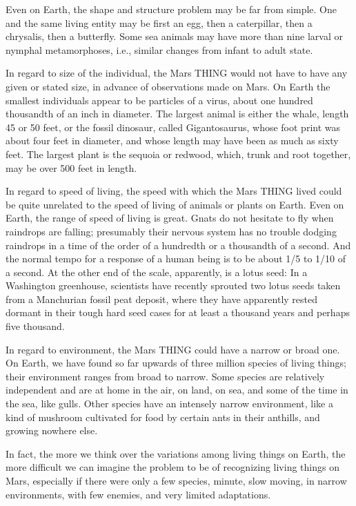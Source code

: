 \documentclass[11pt]{article}
\begin{document}
Even on Earth, the shape and structure problem may be far from simple. One and
the same living entity may be first an egg, then a caterpillar, then a
chrysalis, then a butterfly. Some sea animals may have more than nine larval or
nymphal metamorphoses, i.e., similar changes from infant to adult state.

In regard to size of the individual, the Mars THING would not have to have any
given or stated size, in advance of observations made on Mars. On Earth the
smallest individuals appear to be particles of a virus, about one hundred
thousandth of an inch in diameter. The largest animal is either the whale,
length 45 or 50 feet, or the fossil dinosaur, called Gigantosaurus, whose foot
print was about four feet in diameter, and whose length may have been as much
as sixty feet. The largest plant is the sequoia or redwood, which, trunk and
root together, may be over 500 feet in length.

In regard to speed of living, the speed with which the Mars THING lived could
be quite unrelated to the speed of living of animals or plants on Earth. Even
on Earth, the range of speed of living is great. Gnats do not hesitate to fly
when raindrops are falling; presumably their nervous system has no trouble
dodging raindrops in a time of the order of a hundredth or a thousandth of a
second. And the normal tempo for a response of a human being is to be about
1/5 to 1/10 of a second. At the other end of the scale, apparently, is a lotus
seed: In a Washington greenhouse, scientists have recently sprouted two lotus
seeds taken from a Manchurian fossil peat deposit, where they have apparently
rested dormant in their tough hard seed cases for at least a thousand years and
perhaps five thousand.

In regard to environment, the Mars THING could have a narrow or broad one. On
Earth, we have found so far upwards of three million species of living things;
their environment ranges from broad to narrow. Some species are relatively
independent and are at home in the air, on land, on sea, and some of the time
in the sea, like gulls. Other species have an intensely narrow environment,
like a kind of mushroom cultivated for food by certain ants in their anthills,
and growing nowhere else.

In fact, the more we think over the variations among living things on Earth,
the more difficult we can imagine the problem to be of recognizing living
things on Mars, especially if there were only a few species, minute, slow
moving, in narrow environments, with few enemies, and very limited adaptations.
\end{document}
